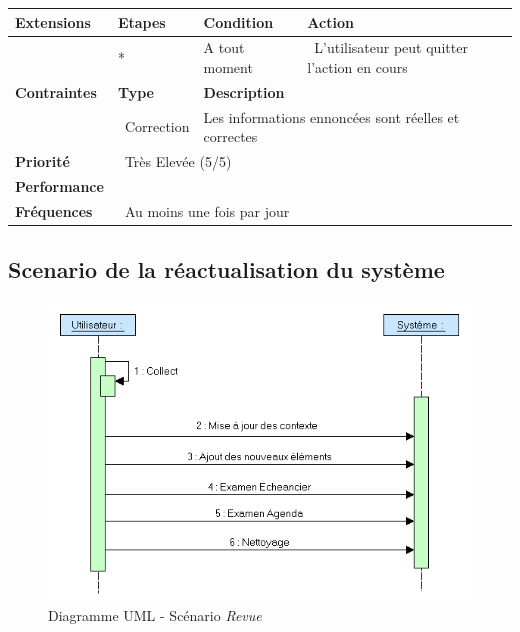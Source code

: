 \begin{tabular}{|p{1.1in}|p{1.1in}|p{1.5in}|p{1.5in}|}
\textbf{Extensions} & \textbf{Etapes} & \textbf{Condition} & \textbf{Action} \\ \hline 
\textbf{}\textbf{~} & * & A tout moment & ~L'utilisateur peut quitter l'action en cours \\ \hline 
\textbf{Contraintes} & \textbf{Type} & \textbf{Description} & ~ \\ \hline 
\textbf{~} & ~Correction &\multicolumn{2}{|p{3in}|}{Les informations ennoncées sont réelles et correctes} \\ \hline 
\textbf{Priorité} & \multicolumn{3}{|p{3.2in}|}{~Très Elevée (5/5)} \\ \hline 
\textbf{Performance} & \multicolumn{3}{|p{3.2in}|}{~} \\ \hline 
\textbf{Fréquences} & \multicolumn{3}{|p{3.2in}|}{~Au moins une fois par jour} \\ \hline 
\end{tabular}







\subsection*{Scenario de la réactualisation du système}

\begin{figure}[H]
	\begin{center}
	\includegraphics[scale=0.5]{diagrams/ScenarRevue.png}
	\caption{Diagramme UML  - Scénario \textit{Revue}}
	\end{center}
	\end{figure}
	

